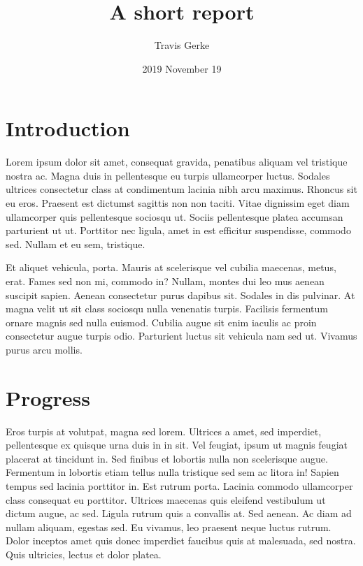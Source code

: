 \documentclass[]{article}
\title{A short report}
\author{Travis Gerke}
\date{2019 November 19}
\makeatletter
\renewcommand{\maketitle}{\bgroup\vspace*{-1cm}\setlength{\parindent}{0pt}
\begin{flushleft}
  \@author
  
  \@date
  
\end{flushleft}\egroup
}
\makeatother
\begin{document}
\maketitle

\hypertarget{introduction}{%
\section{Introduction}\label{introduction}}

Lorem ipsum dolor sit amet, consequat gravida, penatibus aliquam vel
tristique nostra ac. Magna duis in pellentesque eu turpis ullamcorper
luctus. Sodales ultrices consectetur class at condimentum lacinia nibh
arcu maximus. Rhoncus sit eu eros. Praesent est dictumst sagittis non
non taciti. Vitae dignissim eget diam ullamcorper quis pellentesque
sociosqu ut. Sociis pellentesque platea accumsan parturient ut ut.
Porttitor nec ligula, amet in est efficitur suspendisse, commodo sed.
Nullam et eu sem, tristique.

Et aliquet vehicula, porta. Mauris at scelerisque vel cubilia maecenas,
metus, erat. Fames sed non mi, commodo in? Nullam, montes dui leo mus
aenean suscipit sapien. Aenean consectetur purus dapibus sit. Sodales in
dis pulvinar. At magna velit ut sit class sociosqu nulla venenatis
turpis. Facilisis fermentum ornare magnis sed nulla euismod. Cubilia
augue sit enim iaculis ac proin consectetur augue turpis odio.
Parturient luctus sit vehicula nam sed ut. Vivamus purus arcu mollis.

\hypertarget{progress}{%
\section{Progress}\label{progress}}

Eros turpis at volutpat, magna sed lorem. Ultrices a amet, sed
imperdiet, pellentesque ex quisque urna duis in in sit. Vel feugiat,
ipsum ut magnis feugiat placerat at tincidunt in. Sed finibus et
lobortis nulla non scelerisque augue. Fermentum in lobortis etiam tellus
nulla tristique sed sem ac litora in! Sapien tempus sed lacinia
porttitor in. Est rutrum porta. Lacinia commodo ullamcorper class
consequat eu porttitor. Ultrices maecenas quis eleifend vestibulum ut
dictum augue, ac sed. Ligula rutrum quis a convallis at. Sed aenean. Ac
diam ad nullam aliquam, egestas sed. Eu vivamus, leo praesent neque
luctus rutrum. Dolor inceptos amet quis donec imperdiet faucibus quis at
malesuada, sed nostra. Quis ultricies, lectus et dolor platea.
\end{document}
